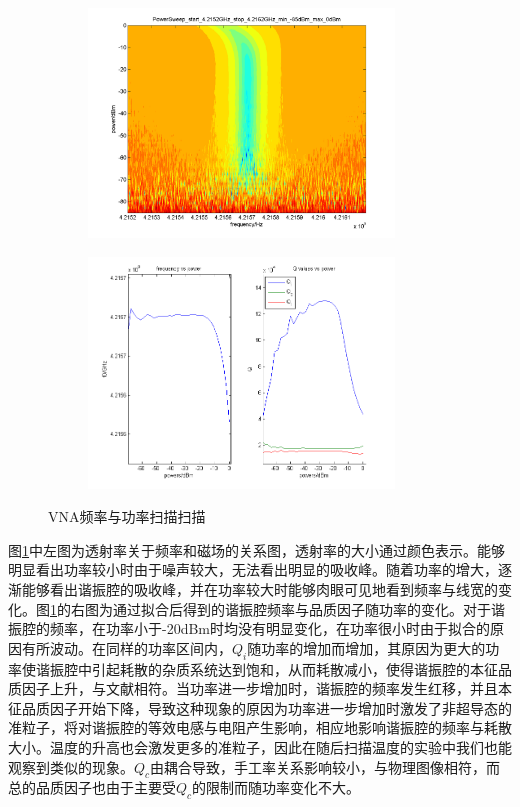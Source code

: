 \begin{figure}[h]
  \centering%
  \begin{subfigure}{0.4\textwidth}
    \includegraphics[width=3.2in]{figures/meas/Test_PowerSweep_start_4.2152GHz_stop_4.2162GHz_min_-85dBm_max_0dBm.png}
  \end{subfigure}%
  \hspace*{\fill}
  \begin{subfigure}{0.4\textwidth}
    \includegraphics[width=3.2in]{figures/meas/Test_PowerSweep_freq_Q_vs_power_20170526T104027.png}
  \end{subfigure}
  \caption{VNA频率与功率扫描扫描}
  \label{fig:PPMSTestPowerSweep}
\end{figure}

                  
                  图\ref{fig:PPMSTestPowerSweep}中左图为透射率关于频率和磁场的关系图，透射率的大小通过颜色表示。能够明显看出功率较小时由于噪声较大，无法看出明显的吸收峰。随着功率的增大，逐渐能够看出谐振腔的吸收峰，并在功率较大时能够肉眼可见地看到频率与线宽的变化。图\ref{fig:PPMSTestPowerSweep}的右图为通过拟合后得到的谐振腔频率与品质因子随功率的变化。对于谐振腔的频率，在功率小于-20dBm时均没有明显变化，在功率很小时由于拟合的原因有所波动。在同样的功率区间内，$Q_i$随功率的增加而增加，其原因为更大的功率使谐振腔中引起耗散的杂质系统达到饱和，从而耗散减小，使得谐振腔的本征品质因子上升，与文献相符\cite{Barends2010APL,Megrant2012,Bruno2015}。当功率进一步增加时，谐振腔的频率发生红移，并且本征品质因子开始下降，导致这种现象的原因为功率进一步增加时激发了非超导态的准粒子，将对谐振腔的等效电感与电阻产生影响，相应地影响谐振腔的频率与耗散大小\cite{Day2003}。温度的升高也会激发更多的准粒子，因此在随后扫描温度的实验中我们也能观察到类似的现象。$Q_c$由耦合导致，手工率关系影响较小，与物理图像相符，而总的品质因子也由于主要受$Q_c$的限制而随功率变化不大。
                        
